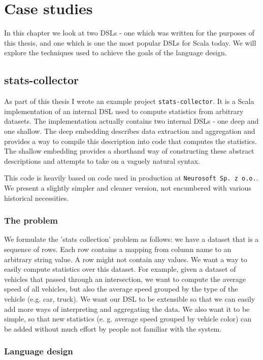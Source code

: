 \chapter{Case studies}

In this chapter we look at two DSLs - one which was written for the purposes of this thesis, and one which is one the most popular DSLs for Scala today. We will explore the techniques used to achieve the goals of the language design.

\section{stats-collector}

As part of this thesis I wrote an example project \texttt{stats-collector}. It is a Scala implementation of an internal DSL used to compute statistics from arbitrary datasets. The implementation actually contains two internal DSLs - one deep and one shallow. The deep embedding describes data extraction and aggregation and provides a way to compile this description into code that computes the statistics. The shallow embedding provides a shorthand way of constructing these abstract descriptions and attempts to take on a vaguely natural syntax.

This code is heavily based on code used in production at \texttt{Neurosoft~Sp.~z~o.o.}. We present a slightly simpler and cleaner version, not encumbered with various historical necessities.

\subsection{The problem}

We formulate the 'stats collection' problem as follows: we have a dataset that is a sequence of rows. Each row contains a mapping from column name to an arbitrary string value. A row might not contain any values. We want a way to easily compute statistics over this dataset. For example, given a dataset of vehicles that passed through an intersection, we want to compute the average speed of all vehicles, but also the average speed grouped by the type of the vehicle (e.g. car, truck). We want our DSL to be extensible so that we can easily add more ways of interpreting and aggregating the data. We also want it to be simple, so that new statistics (e. g. average speed grouped by vehicle color) can be added without much effort by people not familiar with the system.

\subsection{Language design}

